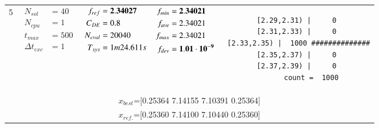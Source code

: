 \begin{table*} [!t]
\begin{tabular}[c]{ccccc}
5
&
{$\!\begin{aligned}
    N_{sol}        &= 40 \\
	N_{cpu}        &= 1 \\
	t_{max}        &= 500 \\
	\Delta t_{exc} &= 1
\end{aligned}$}
&
{$\!\begin{aligned}
	f_{ref} &= {\bf 2.34027} \\
	C_{DE}   &= 0.8 \\
	N_{eval} &= 20040 \\
	T_{sys}  &= 1m24.611s
\end{aligned}$}
&
{$\!\begin{aligned}
    f_{min} &= {\bf 2.34021} \\
    f_{ave} &= 2.34021 \\
    f_{max} &= 2.34021 \\
    f_{dev} &= {\bf 1.01\cdot 10^{-9}}
\end{aligned}$}
&
\begin{minipage}{4.1cm} \fontsize{5pt}{6pt}
\begin{verbatim}
 [2.29,2.31) |     0 
 [2.31,2.33) |     0 
 [2.33,2.35) |  1000 ##############
 [2.35,2.37) |     0 
 [2.37,2.39) |     0 
       count =  1000
 \end{verbatim}
\end{minipage} \\
\multicolumn{5}{c}{{\scriptsize $x_{best}$=[0.25364 7.14155 7.10391 0.25364]}} \\
\multicolumn{5}{c}{{\scriptsize $x_{ref.}$=[0.25360 7.14100 7.10440 0.25360]}} \\

\hline




\end{tabular}
\end{table*}
